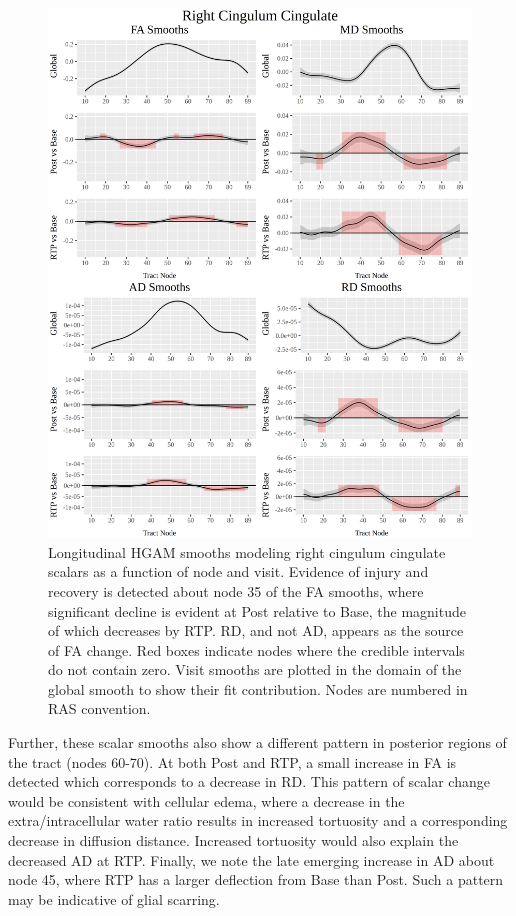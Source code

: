 \documentclass[12pt]{article}
\begin{document}
\begin{figure}[H]
	\centering
	\includegraphics[width=.8\linewidth]{fit_LGIO_rCCing.png}
	\caption{Longitudinal HGAM smooths modeling right cingulum cingulate scalars as a function of node and visit. Evidence of injury and recovery is detected about node 35 of the FA smooths, where significant decline is evident at Post relative to Base, the magnitude of which decreases by RTP. RD, and not AD, appears as the source of FA change. Red boxes indicate nodes where the credible intervals do not contain zero. Visit smooths are plotted in the domain of the global smooth to show their fit contribution. Nodes are numbered in RAS convention.}
	\label{fig:lgio-gam-recov}
\end{figure}

Further, these scalar smooths also show a different pattern in posterior regions of the tract (nodes 60-70). At both Post and RTP, a small increase in FA is detected which corresponds to a decrease in RD. This pattern of scalar change would be consistent with cellular edema, where a decrease in the extra/intracellular water ratio results in increased tortuosity and a corresponding decrease in diffusion distance. Increased tortuosity would also explain the decreased AD at RTP. Finally, we note the late emerging increase in AD about node 45, where RTP has a larger deflection from Base than Post. Such a pattern may be indicative of glial scarring.
\end{document}
